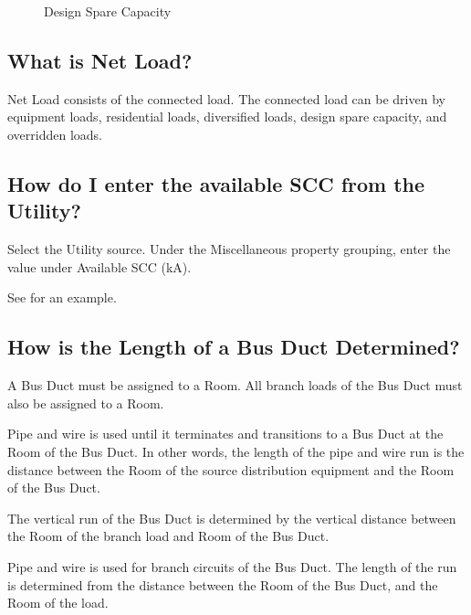 \documentclass[letterpaper,10pt,english]{sphinxmanual}
\begin{document}
\begin{figure}[H]
\centering
\capstart

\noindent{}
\caption{Design Spare Capacity}\label{\detokenize{docs/faq:id6}}\end{figure}


\subsection{What is Net Load?}
\label{\detokenize{docs/faq:what-is-net-load}}\label{\detokenize{docs/faq:net-load}}
Net Load consists of the connected load.  The connected load can be driven by equipment loads, residential loads, diversified loads, design spare capacity, and overridden loads.


\subsection{How do I enter the available SCC from the Utility?}
\label{\detokenize{docs/faq:how-do-i-enter-the-available-scc-from-the-utility}}\label{\detokenize{docs/faq:utility-short-circuit}}
Select the Utility source.  Under the Miscellaneous property grouping, enter the value under Available SCC (kA).

See {\hyperref[\detokenize{docs/userguide/buildingelectricalmodel/one-line/index-one-line:one-line-scc}]{}} for an example.


\subsection{How is the Length of a Bus Duct Determined?}
\label{\detokenize{docs/faq:how-is-the-length-of-a-bus-duct-determined}}\label{\detokenize{docs/faq:bus-duct-length}}
A Bus Duct must be assigned to a Room.  All branch loads of the Bus Duct must also be assigned to a Room.

Pipe and wire is used until it terminates and transitions to a Bus Duct at the Room of the Bus Duct.  In other words, the length of the pipe and wire run is the distance between the Room of the source distribution equipment and the Room of the Bus Duct.

The vertical run of the Bus Duct is determined by the vertical distance between the Room of the branch load and Room of the Bus Duct.

Pipe and wire is used for branch circuits of the Bus Duct.  The length of the run is determined from the distance between the Room of the Bus Duct, and the Room of the load.
\end{document}
